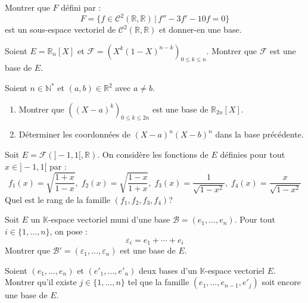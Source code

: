 \documentclass[a4paper,10pt]{report}
\begin{document}
\begin{Exa} Montrer que $F$ défini par :
$$ F=\lbrace f \in \mathcal{C}^2(\mathbb{R}, \mathbb{R}) \, \vert \,  f''-3f'-10f= 0 \rbrace $$
est un sous-espace vectoriel de $\mathcal{C}^2(\mathbb{R}, \mathbb{R})$ et donner-en une base.
\end{Exa} 

\begin{Exa} Soient $E= \mathbb{R}_n[X]$ et $\mathcal{F} = (X^k(1-X)^{n-k})_{0 \leq k \leq n}$. Montrer que $\mathcal{F}$ est une base de $E$.
\end{Exa}


\begin{Exa} Soient $n \in \mathbb{N}^*$ et $(a,b) \in \mathbb{R}^2$ avec $a \neq b$.
\begin{enumerate}
\item Montrer que $((X-a)^k)_{0 \leq k \leq 2n}$ est une base de $\mathbb{R}_{2n}[X]$.
\item Déterminer les coordonnées de $(X-a)^n(X-b)^n$ dans la base précédente.
\end{enumerate}
\end{Exa} 

\begin{Exa} Soit $E = \mathcal{F}(]-1,1[, \mathbb{R})$. On considère les fonctions de $E$ définies pour tout $x \in ]-1,1[$ par : 
    \[
    f_1(x) = \sqrt {\frac{1 + x}{1 - x}} , \; f_2(x) = \sqrt {\frac{1 - x}{1 + x}} , \; f_3(x) = \frac{1}{\sqrt {1 - x^2}}, \; f_4(x) = \frac{x}{\sqrt {1 - x^2}}
    \]
Quel est le rang de la famille $(f_1 ,f_2 ,f_3 ,f_4)$?
\end{Exa}

\begin{Exa} Soit $E$ un $\mathbb{K}$-espace vectoriel muni d'une base $\mathcal{B} = (e_1 , \ldots ,e_n)$. Pour tout $i \in \lbrace 1, \ldots ,n \rbrace$, on pose :
$$\varepsilon_i = e_1 + \cdots + e_i$$
Montrer que $\mathcal{B}' = (\varepsilon_1 , \ldots ,\varepsilon_n)$ est une base de $E$.
\end{Exa} 

\begin{Exa}[\ding{80}] Soient $(e_1 , \ldots ,e_n)$ et $(e'_1 , \ldots ,e'_n)$ deux bases d'un $\mathbb{K}$-espace vectoriel $E$. Montrer qu'il existe $j \in \lbrace 1, \ldots ,n \rbrace$ tel que la famille $(e_1 , \ldots ,e_{n - 1} ,e'_j)$ soit encore une base de $E$.
\end{Exa}
\end{document}

